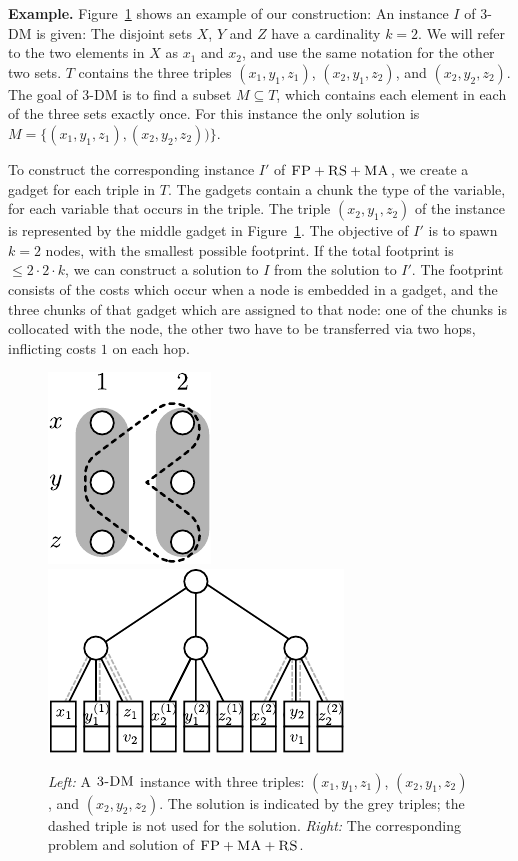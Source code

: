 \documentclass[9pt]{sigcomm-alternate}
\newcommand{\FP}{\textsc{FP}}
\newcommand{\RS}{\textsc{RS}}
\newcommand{\MA}{\textsc{MA}}
\newcommand{\TDM}{\textsc{3-DM}}
\begin{document}
\textbf{Example.} Figure~\ref{fig:fprsma} shows an example of our construction: An
instance $I$ of 3-DM is given: The disjoint sets $X$, $Y$ and $Z$ have a
cardinality $k=2$. We will refer to the two elements in $X$ as $x_1$ and $x_2$,
and use the same notation for the other two sets. $T$ contains the three triples
$(x_1, y_1,
z_1)$, $(x_2, y_1, z_2)$, and $(x_2, y_2, z_2)$. The goal of 3-DM is to find a
subset $M \subseteq T$, which contains each element in each of the three sets
exactly once. For this instance the only solution is $M =
\{(x_1,y_1,z_1),(x_2,y_2,z_2))\}$.

To construct the corresponding instance $I'$ of $\FP+\RS+\MA$, we
create a gadget for each triple in $T$. The gadgets contain a chunk  the
type of the variable, for each variable that occurs in the triple. The triple
$(x_2, y_1, z_2)$ of the instance is represented by the middle gadget in
Figure~\ref{fig:fprsma}. The objective of $I'$ is to spawn $k=2$ nodes,
with the smallest possible footprint. If the total footprint is $\leq
2\cdot2\cdot k$, we can construct a solution to $I$ from the solution to $I'$.
The footprint consists of the costs which occur when a node is embedded in a
gadget, and the three chunks of that gadget which are assigned to that node: one of
the chunks is collocated with the node, the other two have to be transferred
via two hops, inflicting costs $1$ on each hop.
\begin{figure}[t]
\includegraphics[width = 0.3\columnwidth]{figs/np_3dm_formular}
\hfill
\includegraphics[width = 0.6\columnwidth]{figs/np_3dm_construction}
\caption{\textit{Left:} A $\TDM$ instance with three triples:
$(x_1, y_1, z_1)$, $(x_2, y_1, z_2)$, and $(x_2, y_2, z_2)$. The solution is
indicated by the grey triples; the dashed triple is not used for the
solution. \textit{Right:} The corresponding problem and solution of $\FP + \MA
+ \RS$.}
\label{fig:fprsma}
\end{figure}
\end{document}
